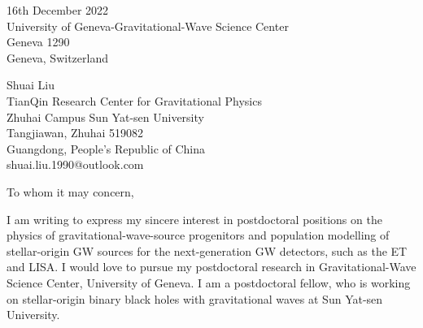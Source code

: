 \documentclass[11pt,a4paper,sans]{letter} %
\date{}
\begin{document}

\begin{letter}{16th December 2022 \\
University of Geneva-Gravitational-Wave Science Center\\
Geneva 1290\\ 
Geneva, Switzerland}

Shuai Liu \\
TianQin Research Center for Gravitational Physics \\
Zhuhai Campus Sun Yat-sen University \\
Tangjiawan, Zhuhai 519082 \\
Guangdong, People's Republic of China \\
shuai.liu.1990@outlook.com








\opening{To whom it may concern,} 
 
    I am writing to express my sincere interest in postdoctoral positions on the physics of gravitational-wave-source
    progenitors and population modelling of stellar-origin GW sources for the next-generation GW detectors, such as the
    ET and LISA. I would love to
pursue my postdoctoral research in Gravitational-Wave Science Center, University of Geneva. I am a postdoctoral fellow, who is working on 
   stellar-origin binary black holes with gravitational waves at Sun Yat-sen University.


\end{letter}
\end{document}
